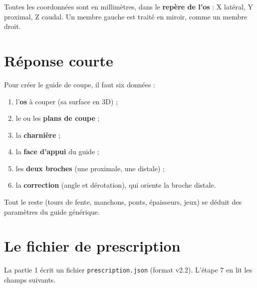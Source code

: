 \documentclass[11pt,a4paper]{article}
\newcommand{\champ}[1]{\texttt{\small #1}}
\begin{document}
Toutes les coordonnées sont en millimètres, dans le \textbf{repère de l'os} : X latéral, Y proximal, Z caudal. Un
membre gauche est traité en miroir, comme un membre droit.

\section{Réponse courte}

Pour créer le guide de coupe, il faut six données :
\begin{enumerate}
  \item l'\textbf{os} à couper (sa surface en 3D) ;
  \item le ou les \textbf{plans de coupe} ;
  \item la \textbf{charnière} ;
  \item la \textbf{face d'appui} du guide ;
  \item les \textbf{deux broches} (une proximale, une distale) ;
  \item la \textbf{correction} (angle et dérotation), qui oriente la broche distale.
\end{enumerate}
Tout le reste (tours de fente, manchons, ponts, épaisseurs, jeux) se déduit des paramètres du guide générique.

\section{Le fichier de prescription}

La partie 1 écrit un fichier \champ{prescription.json} (format v2.2). L'étape 7 en lit les champs suivants.
\end{document}
